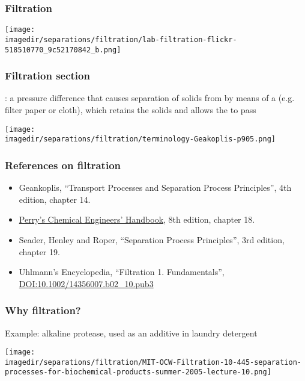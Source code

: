 
\begin{frame}\frametitle{Filtration}
	\begin{center}
		\texttt{[image: \\imagedir/separations/filtration/lab-filtration-flickr-518510770\_9c52170842\_b.png]}
	\end{center}
\end{frame}

\begin{frame}\frametitle{Filtration section}
	{\color{purple}{Filtration}}: a pressure difference that causes separation of solids from {\color{purple}{slurry}} by means of a {\color{purple}{porous medium}} (e.g. filter paper or cloth), which retains the solids and allows the {\color{purple}{filtrate}} to pass
	
	\begin{center}
		\texttt{[image: \\imagedir/separations/filtration/terminology-Geakoplis-p905.png]}
	\end{center}
\end{frame}

\begin{frame}\frametitle{References on filtration}
	\begin{itemize}
		\item	Geankoplis, ``Transport Processes and Separation Process Principles'', 4th edition, chapter 14.
		\item	\href{http://accessengineeringlibrary.com/browse/perrys-chemical-engineers-handbook-eighth-edition}{Perry's Chemical Engineers' Handbook}, 8th edition, chapter 18.
		\item	Seader, Henley and Roper, ``Separation Process Principles'', 3rd edition, chapter 19.
		\item	Uhlmann's Encyclopedia, ``Filtration 1. Fundamentals'', {\tiny \href{http://onlinelibrary.wiley.com/doi/10.1002/14356007.b02\_10.pub3/abstract}{DOI:10.1002/14356007.b02\_10.pub3}}
	\end{itemize}
\end{frame}

\begin{frame}\frametitle{Why filtration?}
	Example: alkaline protease, used as an additive in laundry detergent
	\begin{center}
		\texttt{[image: \\imagedir/separations/filtration/MIT-OCW-Filtration-10-445-separation-processes-for-biochemical-products-summer-2005-lecture-10.png]}
	\end{center}
\end{frame}

